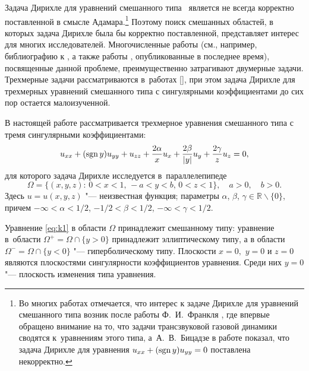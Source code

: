 \makerutitle


\newpage


Задача Дирихле для уравнений смешанного типа~\cite{uk:bib:Frankl,uk:bib:Bitsadze} является не всегда корректно поставленной в смысле Адамара.\footnote{Во многих работах отмечается, 
что интерес к задаче Дирихле для уравнений смешанного типа возник после работы Ф.~И.~Франкля \cite{uk:bib:Frankl}, где впервые обращено внимание на то, что задачи трансзвуковой газовой динамики сводятся к~уравнениям этого типа, а~А.~В.~Бицадзе в работе \cite{uk:bib:Bitsadze} показал, что задача Дирихле для уравнения $u_{xx} +(\mathop{\rm sgn}y)u_{yy}=0$ поставлена некорректно.}\!\!
Поэтому поиск смешанных областей, в которых задача Дирихле была бы корректно поставленной, представляет интерес для многих исследователей. 
Многочисленные работы (см., например, библиографию к \cite{uk:bib:Xachev3}, а также работы \cite{uk:bib:Sabitov, uk:bib:SabitovSul, uk:bib:SabitovVag, uk:bib:Xayrullin, uk:bib:Safina1, Zbl1363.35258, Zbl1087.35071}, опубликованные в последнее время),
посвященные данной проблеме, преимущественно затрагивают двумерные задачи.
Трехмерные задачи рассматриваются в~работах [], при этом задача Дирихле для трехмерных уравнений смешанного типа с сингулярными коэффициентами до сих пор остается малоизученной. 

\smallskip

В настоящей работе рассматривается трехмерное уравнения смешанного типа с тремя сингулярными коэффициентами:
\begin{equation}
u_{xx}+(\mathop{\rm sgn}y)u_{yy}+u_{zz}+\frac{2\alpha}{x}u_x+\frac{2\beta}{|y|}u_y+\frac{2\gamma}{z}u_z=0,
\label{eq:k1}
\end{equation}
для которого задача Дирихле исследуется в~параллелепипеде
$$\Omega=\{(x,y,z):\,0<x< 1,\,-a<y< b,\,0<z<1\}, \quad  a>0 , \quad   b> 0.$$
Здесь $u=u(x,y,z)$ "--- неизвестная функция; 
параметры $\alpha$, $\beta$, $\gamma\in \mathbb R\backslash\{ 0\}$, причем $-\infty<\alpha<1/2$, $-1/2<\beta<1/2$, 
$-\infty<\gamma<1/2$.

Уравнение \eqref{eq:k1} в области $\Omega $ принадлежит смешанному типу: уравнение  в~области $\Omega^+=\Omega\cap\{y>0\}$ принадлежит эллиптическому типу, а в области $\Omega^-=\Omega\cap\{y<0\}$ "--- гиперболическому типу. 
Плоскости  $x = 0,$ $y = 0$ и $z = 0$  являются плоскостями сингулярности коэффициентов уравнения. 
Среди них $y = 0$ "--- плоскость изменения типа уравнения.

